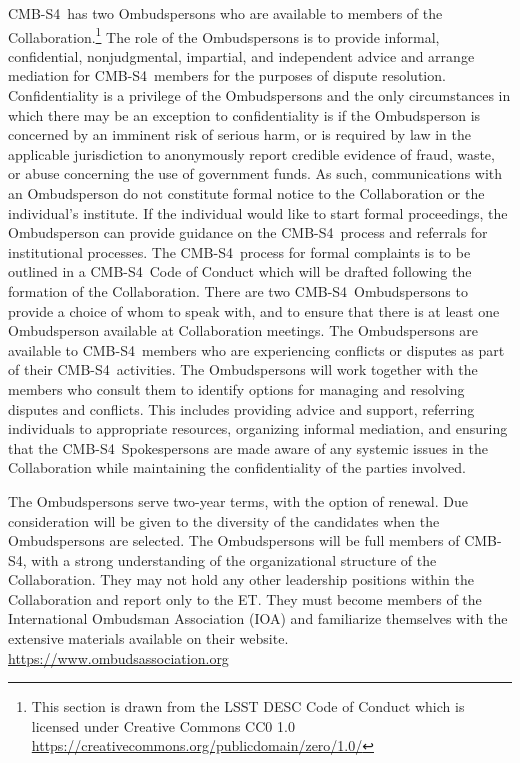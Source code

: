 \documentclass[12pt]{article}
\newcommand{\exec}{{Executive Team}}
\newcommand{\shorte}{{ET}}  %
\newcommand\collabname{CMB-S4}
\begin{document}
\collabname\ has two Ombudspersons who are available to members of the Collaboration.\footnote{This section is drawn from the LSST DESC Code of Conduct which is licensed under Creative Commons CC0 1.0 \url{https://creativecommons.org/publicdomain/zero/1.0/}} The role of the Ombudspersons is to provide informal, confidential, nonjudgmental, impartial, and independent advice and arrange mediation for \collabname\ members for the purposes of dispute resolution. Confidentiality is a privilege of the Ombudspersons and the only circumstances in which there may be an exception to confidentiality is if the Ombudsperson is concerned by an imminent risk of serious harm, or is required by law in the applicable jurisdiction to anonymously report credible evidence of fraud, waste, or abuse concerning the use of government funds. As such, communications with an Ombudsperson do not constitute formal notice to the Collaboration or the individual's institute. If the individual would like to start formal proceedings, the Ombudsperson can provide guidance on the \collabname\ process and referrals for institutional processes. The \collabname\ process for formal complaints is to be outlined in a \collabname\ Code of Conduct which will be drafted following the formation of the Collaboration. There are two \collabname\ Ombudspersons to provide a choice of whom to speak with, and to ensure that there is at least one Ombudsperson available at Collaboration meetings. The Ombudspersons are available to \collabname\ members who are experiencing conflicts or disputes as part of their \collabname\ activities. The Ombudspersons will work together with the members who consult them to identify options for managing and resolving disputes and conflicts. This includes providing advice and support, referring individuals to appropriate resources, organizing informal mediation, and ensuring that the \collabname\ Spokespersons are made aware of any systemic issues in the Collaboration while maintaining the confidentiality of the parties involved.

The Ombudspersons serve two-year terms, with the option of renewal. Due consideration will be given to the diversity of the candidates when the Ombudspersons are selected. The Ombudspersons will be full members of \collabname, with a strong understanding of the organizational structure of the Collaboration. They may not hold any other leadership positions within the Collaboration and report only to the \shorte. They must become members of the International Ombudsman Association (IOA) and familiarize themselves with the extensive materials available on their website. \url{https://www.ombudsassociation.org}
\end{document}
